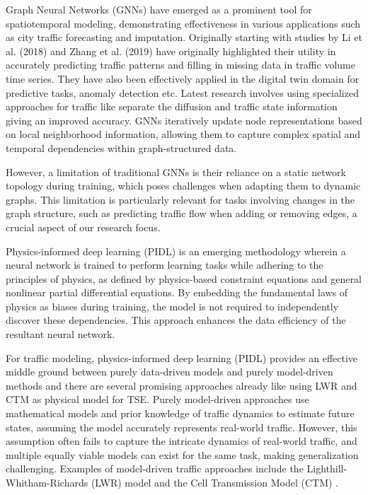 Graph Neural Networks (GNNs) \cite{gnn} have emerged as a prominent tool for spatiotemporal modeling, demonstrating effectiveness in various applications such as city traffic forecasting and imputation\cite{jiang2023graph}\cite{sharma2023graph}. Originally starting with studies by Li et al. (2018) \cite{li2018gnn} and Zhang et al. (2019) \cite{wavenet} have originally highlighted their utility in accurately predicting traffic patterns and filling in missing data in traffic volume time series. They have also been effectively applied in the digital twin domain for predictive tasks\cite{pred23}, anomaly detection\cite{gnn23} etc. Latest research involves using specialized approaches for traffic like separate the diffusion and traffic state\cite{shao2022decoupleddynamicspatialtemporalgraph} information giving an improved accuracy. GNNs iteratively update node representations based on local neighborhood information, allowing them to capture complex spatial and temporal dependencies within graph-structured data. 

However, a limitation of traditional GNNs is their reliance on a static network topology during training, which poses challenges when adapting them to dynamic graphs. This limitation is particularly relevant for tasks involving changes in the graph structure, such as predicting traffic flow when adding or removing edges, a crucial aspect of our research focus.

Physics-informed deep learning (PIDL) \cite{raissi2017physics} is an emerging methodology wherein a neural network is trained to perform learning tasks while adhering to the principles of physics, as defined by physics-based constraint equations and general nonlinear partial differential equations. By embedding the fundamental laws of physics as biases during training, the model is not required to independently discover these dependencies. This approach enhances the data efficiency of the resultant neural network.

For traffic modeling, physics-informed deep learning (PIDL) provides an effective middle ground between purely data-driven models and purely model-driven methods and there are several promising approaches already like using LWR\cite{lwr} and CTM\cite{ctm} as physical model for TSE\cite{pidl}\cite{zhang2024physics}. Purely model-driven approaches use mathematical models and prior knowledge of traffic dynamics to estimate future states, assuming the model accurately represents real-world traffic. However, this assumption often fails to capture the intricate dynamics of real-world traffic, and multiple equally viable models can exist for the same task, making generalization challenging. Examples of model-driven traffic approaches include the Lighthill-Whitham-Richards (LWR) \cite{lwr} model and the Cell Transmission Model (CTM) \cite{ctm}. 

